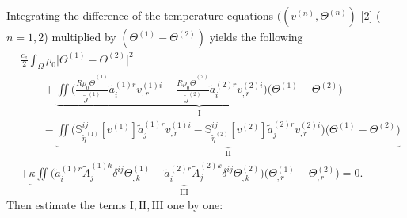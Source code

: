 \documentclass[12pt,a4paper]{amsart}
\numberwithin{equation}{section}
\theoremstyle{plain}
\theoremstyle{definition}
\begin{document}
Integrating the difference of the temperature equations $((v^{(n)},\Theta^{(n)})$ \eqref{2} ($n=1,2$) multiplied by $(\Theta^{(1)}-\Theta^{(2)})$ yields the following
\begin{align*}
& \frac{c_v}{2}\int_{\Omega}\rho_0\Big| \Theta^{(1)}-\Theta^{(2)} \Big|^2 \\
&\qquad+\underbrace{\iint   \Big(\frac{R\rho_0\widetilde{\Theta}^{(1)}}{\widetilde{J}^{(1)}}\widetilde{a}^{(1)r}_iv^{(1)i}_{,r}-\frac{R\rho_0\widetilde{\Theta}^{(2)}}{\widetilde{J}^{(2)}}\widetilde{a}^{(2)r}_iv^{(2)i}_{,r}\Big) \Big( \Theta^{(1)}-\Theta^{(2)}\Big)}_{\mathrm{I}}\\
&\qquad-\underbrace{\iint  \Big(\mathbb{S}^{ij}_{\widetilde{\eta}^{(1)}}[v^{(1)}]\widetilde{a}^{(1)r}_jv^{(1)i}_{,r}-\mathbb{S}^{ij}_{\widetilde{\eta}^{(2)}}[v^{(2)}]\widetilde{a}^{(2)r}_jv^{(2)i}_{,r}\Big)\Big( \Theta^{(1)}-\Theta^{(2)}\Big)}_{\mathrm{II}}\\
&+\underbrace{\kappa\iint \Big(\widetilde{a}^{(1)r}_i\widetilde{A}^{(1)k}_j \delta^{ij} \Theta^{(1)}_{,k}-\widetilde{a}^{(2)r}_i\widetilde{A}^{(2)k}_j \delta^{ij} \Theta^{(2)}_{,k}\Big)\Big( \Theta^{(1)}_{,r}-\Theta^{(2)}_{,r}\Big)}_{\mathrm{III}}=0.
\end{align*}
Then estimate the terms $\mathrm{I},\mathrm{II},\mathrm{III}$ one by one:
\end{document}
